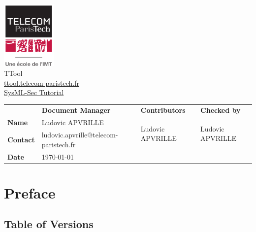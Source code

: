 \documentclass[12pt]{article}
\begin{document}
\sloppy 

\begin{center}

\includegraphics[width=0.2\textwidth]{fig/logotpt}
\vspace{10 pt}\\
\Huge TTool \\
\vspace{10 pt}
\Large \url{ttool.telecom-paristech.fr}
\vspace{20 pt}\\
\underline{\Large SysML-Sec Tutorial}
\vspace{30 pt}
\end{center}

\begin{table}[H]
\large
\centering
\begin{adjustbox}{width=\textwidth}
\begin{tabular}{ |p{1.6cm}|p{6.0cm}|p{4.2cm}|p{4.2cm}| }
\hhline{----}
 & \textbf{Document Manager} & \textbf{Contributors}  & \textbf{Checked by}  \\ 
\hhline{----}
\textbf{Name}   & Ludovic APVRILLE & \multirow{2}{*}{Ludovic APVRILLE} &
\multirow{2}{*}{Ludovic APVRILLE} \\
\hhline{--~~}
\textbf{Contact} & ludovic.apvrille@telecom-paristech.fr &  &  \\ 
\hhline{--~~}
\textbf{Date} & \today &  &  \\ 
\hline
\end{tabular}
\end{adjustbox}
\end{table}

\newpage
\tableofcontents


\newpage
\section{Preface}

\subsection{Table of Versions}
\end{document}
